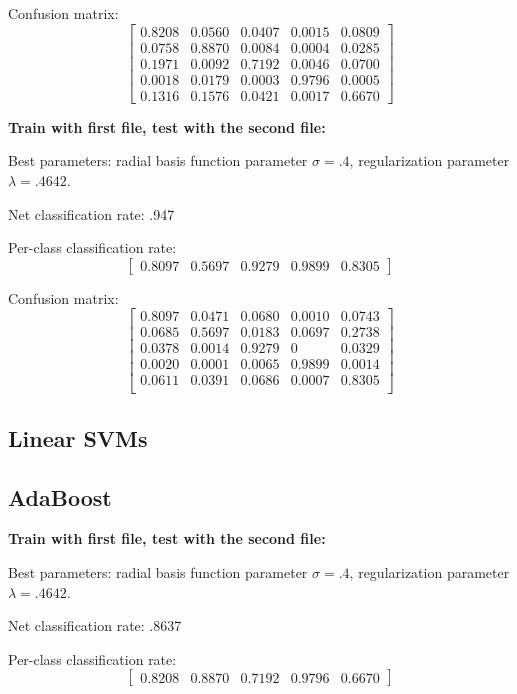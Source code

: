 \documentclass[letterpaper]{article}
\begin{document}
Confusion matrix:
$$\begin{bmatrix}
0.8208 &   0.0560  & 0.0407 &   0.0015  &  0.0809\\
    0.0758&    0.8870 &   0.0084&    0.0004 &   0.0285\\
    0.1971   & 0.0092   & 0.7192  &  0.0046   & 0.0700\\
    0.0018   & 0.0179    &0.0003  &  0.9796  &  0.0005\\
    0.1316   &0.1576    &0.0421  &  0.0017  &  0.6670
\end{bmatrix}$$

\textbf{Train with first file, test with the second file:}

Best parameters: radial basis function parameter $\sigma=.4$, regularization parameter $\lambda=.4642$.

Net classification rate: .947

Per-class classification rate: 
$$\begin{bmatrix}0.8097  &  0.5697   & 0.9279   & 0.9899  &  0.8305\end{bmatrix}$$

Confusion matrix:
$$\begin{bmatrix}
0.8097&    0.0471&    0.0680  &  0.0010  &  0.0743\\
    0.0685&    0.5697&    0.0183&    0.0697  &  0.2738\\
    0.0378   & 0.0014&    0.9279  &       0 &   0.0329\\
    0.0020 &   0.0001 &   0.0065 &   0.9899  &  0.0014\\
    0.0611   & 0.0391  &  0.0686  &  0.0007&    0.8305\\
\end{bmatrix}$$


\subsection*{Linear SVMs}

\subsection*{AdaBoost}

\textbf{Train with first file, test with the second file:}

Best parameters: radial basis function parameter $\sigma=.4$, regularization parameter $\lambda=.4642$.

Net classification rate: .8637

Per-class classification rate: 
$$\begin{bmatrix}0.8208   & 0.8870  &  0.7192   & 0.9796 &   0.6670\end{bmatrix}$$
\end{document}
